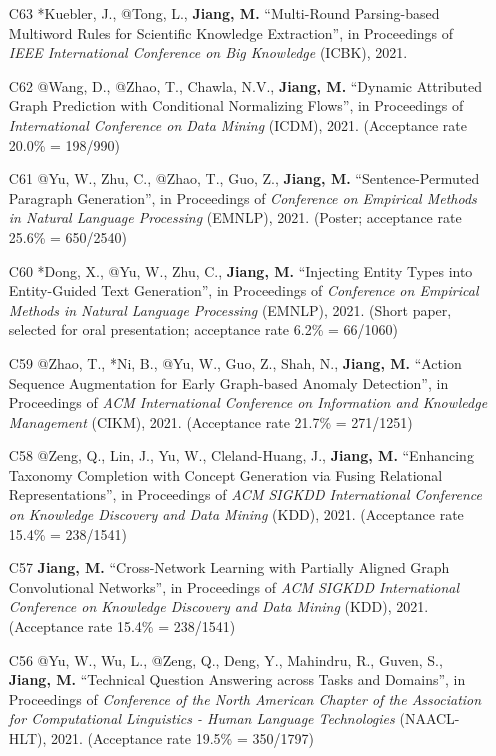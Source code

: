 \documentclass[10pt]{article}
\newenvironment{myindentpar}[1]%
{\begin{list}{}%
         {\setlength{\leftmargin}{#1}}%
         \item[]%
}
{\end{list}}
\newcounter{list}
\begin{document}
\begin{myindentpar}{0.00cm}
\begin{enumerate}[leftmargin=.5cm]
\item[C63] *Kuebler, J., @Tong, L., \textbf{Jiang, M.} ``Multi-Round Parsing-based Multiword Rules for Scientific Knowledge Extraction'', in Proceedings of \textit{IEEE International Conference on Big Knowledge} (ICBK), 2021.
		
\item[C62] @Wang, D., @Zhao, T., Chawla, N.V., \textbf{Jiang, M.} ``Dynamic Attributed Graph Prediction with Conditional Normalizing Flows'', in Proceedings of \textit{International Conference on Data Mining} (ICDM), 2021. (Acceptance rate 20.0\% = 198/990)

\item[C61] @Yu, W., Zhu, C., @Zhao, T., Guo, Z., \textbf{Jiang, M.} ``Sentence-Permuted Paragraph Generation'', in Proceedings of \textit{Conference on Empirical Methods in Natural Language Processing} (EMNLP), 2021. (Poster; acceptance rate 25.6\% = 650/2540)

\item[C60] *Dong, X., @Yu, W., Zhu, C., \textbf{Jiang, M.} ``Injecting Entity Types into Entity-Guided Text Generation'', in Proceedings of \textit{Conference on Empirical Methods in Natural Language Processing} (EMNLP), 2021. (Short paper, selected for oral presentation; acceptance rate 6.2\% = 66/1060)

\item[C59] @Zhao, T., *Ni, B., @Yu, W., Guo, Z., Shah, N., \textbf{Jiang, M.} ``Action Sequence Augmentation for Early Graph-based Anomaly Detection'', in Proceedings of \textit{ACM International Conference on Information and Knowledge Management} (CIKM), 2021. (Acceptance rate 21.7\% = 271/1251)
		
\item[C58] @Zeng, Q., Lin, J., Yu, W., Cleland-Huang, J., \textbf{Jiang, M.} ``Enhancing Taxonomy Completion with Concept Generation via Fusing Relational Representations'', in Proceedings of \textit{ACM SIGKDD International Conference on Knowledge Discovery and Data Mining} (KDD), 2021. (Acceptance rate 15.4\% = 238/1541)

\item[C57] \textbf{Jiang, M.} ``Cross-Network Learning with Partially Aligned Graph Convolutional Networks'', in Proceedings of \textit{ACM SIGKDD International Conference on Knowledge Discovery and Data Mining} (KDD), 2021. (Acceptance rate 15.4\% = 238/1541)	

\item[C56] @Yu, W., Wu, L., @Zeng, Q., Deng, Y., Mahindru, R., Guven, S., \textbf{Jiang, M.} ``Technical Question Answering across Tasks and Domains'', in Proceedings of \textit{Conference of the North American Chapter of the Association for Computational Linguistics - Human Language Technologies} (NAACL-HLT), 2021. (Acceptance rate 19.5\% = 350/1797)


\end{enumerate}
\end{myindentpar}
\end{document}

